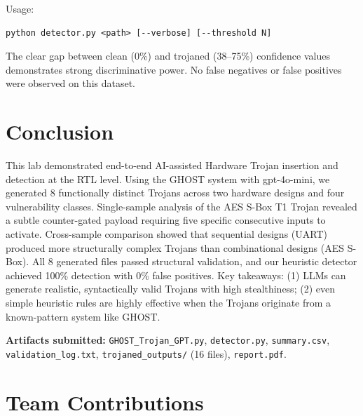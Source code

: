 \documentclass[11pt]{article}
\begin{document}
Usage:
\begin{lstlisting}[style=verilog]
python detector.py <path> [--verbose] [--threshold N]
\end{lstlisting}

The clear gap between clean (0\%) and trojaned (38--75\%) confidence values demonstrates strong discriminative power. No false negatives or false positives were observed on this dataset.

\section{Conclusion}

This lab demonstrated end-to-end AI-assisted Hardware Trojan insertion and detection at the RTL level. Using the GHOST system with gpt-4o-mini, we generated 8 functionally distinct Trojans across two hardware designs and four vulnerability classes. Single-sample analysis of the AES S-Box T1 Trojan revealed a subtle counter-gated payload requiring five specific consecutive inputs to activate. Cross-sample comparison showed that sequential designs (UART) produced more structurally complex Trojans than combinational designs (AES S-Box). All 8 generated files passed structural validation, and our heuristic detector achieved 100\% detection with 0\% false positives. Key takeaways: (1) LLMs can generate realistic, syntactically valid Trojans with high stealthiness; (2) even simple heuristic rules are highly effective when the Trojans originate from a known-pattern system like GHOST.

\vspace{4pt}

\noindent\textbf{Artifacts submitted:} 
\texttt{GHOST\_Trojan\_GPT.py}, 
\texttt{detector.py}, 
\texttt{summary.csv}, 
\texttt{validation\_log.txt}, 
\texttt{trojaned\_outputs/} (16 files), 
\texttt{report.pdf}. 
 
\section*{Team Contributions} 
\label{sec:contributions}
\end{document}
